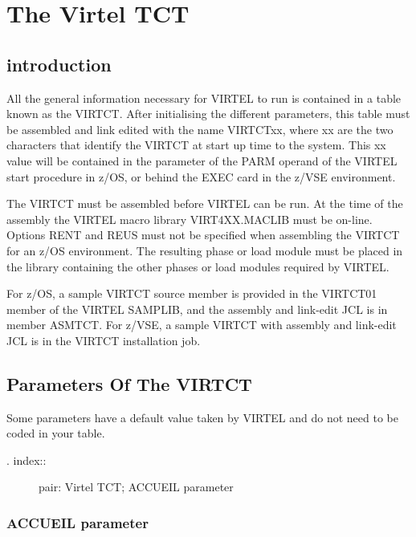 \documentclass[letterpaper,10pt,english]{sphinxmanual}
\begin{document}
\chapter{The Virtel TCT}
\label{\detokenize{Installation_Guide:the-virtel-tct}}

\section{introduction}
\label{\detokenize{Installation_Guide:id3}}
All the general information necessary for VIRTEL to run is contained in a table known as the VIRTCT. After initialising the different  parameters, this table must be assembled and link edited with the name VIRTCTxx, where xx are the two characters that identify the VIRTCT at start up time to the system. This xx value will be contained in the parameter of the PARM operand of the VIRTEL start procedure in z/OS, or behind the EXEC card in the z/VSE environment.

The VIRTCT must be assembled before VIRTEL can be run. At the time of the assembly the VIRTEL macro library VIRT4XX.MACLIB must be on-line. Options RENT and REUS must not be specified when assembling the VIRTCT for an z/OS environment. The resulting phase or load module must be placed in the library containing the other phases or load modules required by VIRTEL.

For z/OS, a sample VIRTCT source member is provided in the VIRTCT01 member of the VIRTEL SAMPLIB, and the assembly and link-edit JCL is in member ASMTCT. For z/VSE, a sample VIRTCT with assembly and link-edit JCL is in the VIRTCT installation job.


\section{Parameters Of The VIRTCT}
\label{\detokenize{Installation_Guide:parameters-of-the-virtct}}
Some parameters have a default value taken by VIRTEL and do not need to be coded in your table.
\begin{description}
\item[{. index::}] \leavevmode
pair: Virtel TCT; ACCUEIL parameter

\end{description}


\subsection{ACCUEIL parameter}
\label{\detokenize{Installation_Guide:accueil-parameter}}
\begin{sphinxVerbatim}[commandchars=\\\{\}]
\PYG{p}{[}\PYG{p}{]} 
\end{sphinxVerbatim}
\end{document}
